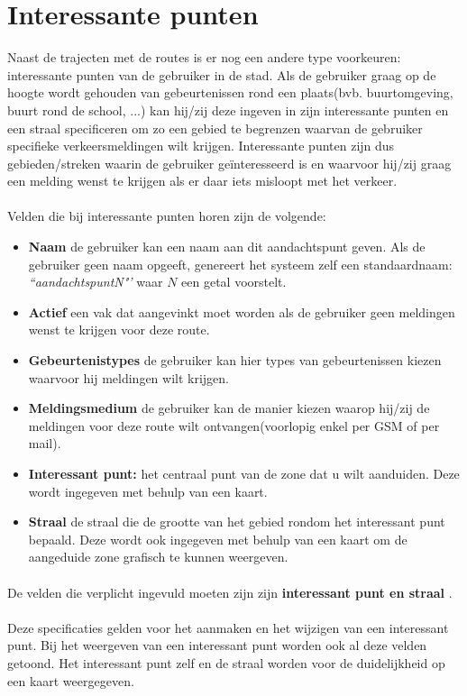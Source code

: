 \documentclass{scrbook}
\newcommand*{\veld}[1]{
	\item \textbf{#1} 
}
\newcommand*{\verplicht}[1]{
	\textbf{#1}
}
\begin{document}
\section{Interessante punten}
Naast de trajecten met de routes is er nog een andere type voorkeuren: interessante punten van de gebruiker in de stad.
Als de gebruiker graag op de hoogte wordt gehouden van gebeurtenissen rond een plaats(bvb. buurtomgeving, buurt rond de school, ...) kan hij/zij deze ingeven in zijn interessante punten en een straal specificeren om zo een gebied te begrenzen waarvan de gebruiker specifieke verkeersmeldingen wilt krijgen. Interessante punten zijn dus gebieden/streken waarin de gebruiker ge\"interesseerd is en waarvoor hij/zij graag een melding wenst te krijgen als er daar iets misloopt met het verkeer.

\paragraph{}Velden die bij interessante punten horen zijn de volgende:
\begin{itemize}
\veld{Naam} de gebruiker kan een naam aan dit aandachtspunt geven. Als de gebruiker geen naam opgeeft, genereert het systeem zelf een standaardnaam: \emph{``aandachtspuntN"'} waar $N$ een getal voorstelt.
\veld{Actief} een vak dat aangevinkt moet worden als de gebruiker geen meldingen wenst te krijgen voor deze route.%
\veld{Gebeurtenistypes} de gebruiker kan hier types van gebeurtenissen kiezen waarvoor hij meldingen wilt krijgen.
\veld{Meldingsmedium} de gebruiker kan de manier kiezen waarop hij/zij de meldingen voor deze route wilt ontvangen(voorlopig enkel per GSM of per mail).
\veld{Interessant punt:} het centraal punt van de zone dat u wilt aanduiden. Deze wordt ingegeven met behulp van een kaart.
\veld{Straal} de straal die de grootte van het gebied rondom het interessant punt bepaald. Deze wordt ook ingegeven met behulp van een kaart om de aangeduide zone grafisch te kunnen weergeven.
\end{itemize} 
\paragraph{}De velden die verplicht ingevuld moeten zijn zijn \verplicht{interessant punt en straal}. 
\paragraph{}Deze specificaties gelden voor het aanmaken en het wijzigen van een interessant punt. Bij het weergeven van een interessant punt worden ook al deze velden getoond. Het interessant punt zelf en de straal worden voor de duidelijkheid op een kaart weergegeven.
\end{document}
